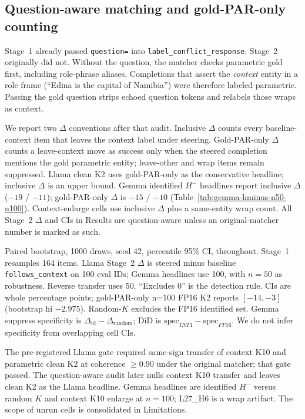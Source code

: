 \documentclass{article} %
\begin{document}
\subsection{Question-aware matching and gold-PAR-only counting}
\label{sec:matcher}

Stage~1 already passed \texttt{question=} into \texttt{label\_conflict\_response}. Stage~2 originally did not. Without the question, the matcher checks parametric gold first, including role-phrase aliases. Completions that assert the \emph{context} entity in a role frame (``Edina is the capital of Namibia'') were therefore labeled parametric. Passing the gold question strips echoed question tokens and relabels those wraps as context.

We report two $\Delta$ conventions after that audit. Inclusive $\Delta$ counts every baseline-context item that leaves the context label under steering. Gold-PAR-only $\Delta$ counts a leave-context move as success only when the steered completion mentions the gold parametric entity; leave-other and wrap items remain suppressed. Llama clean K2 uses gold-PAR-only as the conservative headline; inclusive $\Delta$ is an upper bound. Gemma identified $H^{-}$ headlines report inclusive $\Delta$ ($-19$ / $-11$); gold-PAR-only $\Delta$ is $-15$ / $-10$ (Table~\ref{tab:gemma-hminus-n50-n100}). Context-enlarge cells use inclusive $\Delta$ plus a same-entity wrap count. All Stage~2 $\Delta$ and CIs in Results are question-aware unless an original-matcher number is marked as such.

Paired bootstrap, 1000 draws, seed 42, percentile 95\% CI, throughout. Stage~1 resamples 164 items. Llama Stage~2 $\Delta$ is steered minus baseline \texttt{follows\_context} on 100 eval IDs; Gemma headlines use 100, with $n{=}50$ as robustness. Reverse transfer uses 50. ``Excludes 0'' is the detection rule. CIs are whole percentage points; gold-PAR-only n=100 FP16 K2 reports $[-14,-3]$ (bootstrap hi $-2.975$). Random-$K$ excludes the FP16 identified set. Gemma suppress specificity is $\Delta_{\mathrm{id}}-\Delta_{\mathrm{random}}$; DiD is $\mathrm{spec}_{INT4}-\mathrm{spec}_{FP16}$. We do not infer specificity from overlapping cell CIs.

The pre-registered Llama gate required same-sign transfer of context K10 and parametric clean K2 at coherence $\ge 0.90$ under the original matcher; that gate passed. The question-aware audit later nulls context K10 transfer and leaves clean K2 as the Llama headline. Gemma headlines are identified $H^{-}$ versus random $K$ and context K10 enlarge at $n{=}100$; L27\_H6 is a wrap artifact. The scope of unrun cells is consolidated in Limitations.
\end{document}
